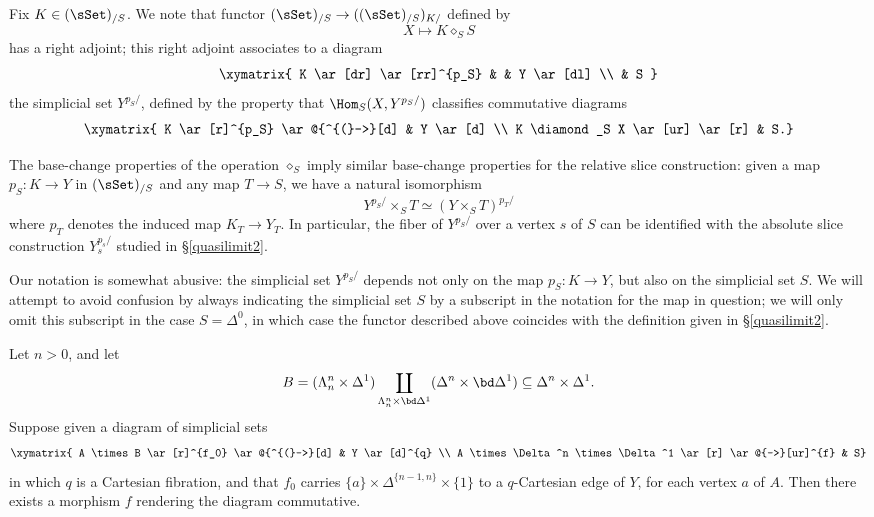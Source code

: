 Fix $K \in (\sSet)_{/S}$. We note that functor $(\sSet)_{/S} \rightarrow ( (\sSet)_{/S})_{K/}$ defined by
$$ X \mapsto K \diamond_S S$$
has a right adjoint; this right adjoint associates to a diagram
$$ \xymatrix{ K \ar[dr] \ar[rr]^{p_S} & & Y \ar[dl] \\
& S }$$
the simplicial set $Y^{p_S/}$, defined by the property that
$ \Hom_{S}(X, Y^{p_S/})$ classifies commutative diagrams
$$ \xymatrix{ K  \ar[r]^{p_S} \ar@{^{(}->}[d] & Y \ar[d] \\  
K \diamond_S X \ar[ur] \ar[r] & S.}$$

The base-change properties of the operation $\diamond_S$ imply similar base-change properties for the relative slice construction: given a map $p_S: K \rightarrow Y$ in $(\sSet)_{/S}$ and any map $T \rightarrow S$, we have a natural isomorphism
$$ Y^{p_S/} \times_{S} T \simeq (Y \times_{S} T)^{p_T/}$$
where $p_T$ denotes the induced map $K_{T} \rightarrow Y_{T}$. 
In particular, the fiber of $Y^{p_S/}$ over a vertex $s$ of $S$ can be identified with the absolute slice construction $Y_s^{p_s/}$ studied in \S \ref{quasilimit2}.

\begin{remark}
Our notation is somewhat abusive: the simplicial set $Y^{p_S/}$ depends not only on the map
$p_S: K \rightarrow Y$, but also on the simplicial set $S$. We will attempt to avoid confusion by always indicating the simplicial set $S$ by a subscript in the notation for the map in question; we will only omit this subscript in the case $S = \Delta^0$, in which case the functor described above
coincides with the definition given in \S \ref{quasilimit2}.
\end{remark}

\begin{lemma}\label{stumble}
Let $n > 0$, and let 
$$B = ( \Lambda^n_n \times \Delta^1 ) \coprod_{ \Lambda^n_n \times \bd \Delta^1 }
( \Delta^n \times \bd \Delta^1 ) \subseteq \Delta^n \times \Delta^1.$$
Suppose given a diagram of simplicial sets
$$ \xymatrix{ A \times B \ar[r]^{f_0} \ar@{^{(}->}[d] & Y \ar[d]^{q} \\
A \times \Delta^n \times \Delta^1 \ar[r] \ar@{-->}[ur]^{f} & S}$$
in which $q$ is a Cartesian fibration, and that $f_0$ carries $\{ a\} \times \Delta^{ \{n-1,n\} } \times \{1\}$ to a
$q$-Cartesian edge of $Y$, for each vertex $a$ of $A$. Then there exists a morphism $f$
rendering the diagram commutative. 
\end{lemma}

